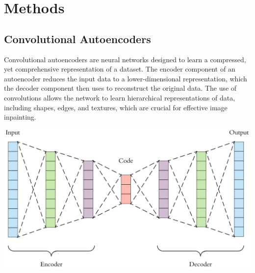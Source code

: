\documentclass[12pt,a4paper]{article}
\begin{document}
\section{Methods}

\subsection{Convolutional Autoencoders}
Convolutional autoencoders are neural networks designed to learn a compressed, yet comprehensive representation of a dataset. The encoder component of an autoencoder reduces the input data to a lower-dimensional representation, which the decoder component then uses to reconstruct the original data. The use of convolutions allows the network to learn hierarchical representations of data, including shapes, edges, and textures, which are crucial for effective image inpainting.
\begin{center}
	\includegraphics[scale=0.2]{autoencoder.png}
\end{center}
\end{document}
